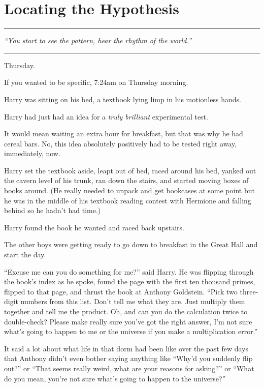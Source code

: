 \chapter{Locating the Hypothesis}

\begin{center}\rule{3in}{0.4pt}\end{center}

\emph{``You start to see the pattern, hear the rhythm of the world.''}

\begin{center}\rule{3in}{0.4pt}\end{center}

Thursday.

If you wanted to be specific, 7:24am on Thursday morning.

Harry was sitting on his bed, a textbook lying limp in his motionless
hands.

Harry had just had an idea for a \emph{truly brilliant} experimental
test.

It would mean waiting an extra hour for breakfast, but that was why he
had cereal bars. No, this idea absolutely positively had to be tested
right away, immediately, now.

Harry set the textbook aside, leapt out of bed, raced around his bed,
yanked out the cavern level of his trunk, ran down the stairs, and
started moving boxes of books around. (He really needed to unpack and
get bookcases at some point but he was in the middle of his textbook
reading contest with Hermione and falling behind so he hadn't had time.)

Harry found the book he wanted and raced back upstairs.

The other boys were getting ready to go down to breakfast in the Great
Hall and start the day.

``Excuse me can you do something for me?'' said Harry. He was flipping
through the book's index as he spoke, found the page with the first ten
thousand primes, flipped to that page, and thrust the book at Anthony
Goldstein. ``Pick two three-digit numbers from this list. Don't tell me
what they are. Just multiply them together and tell me the product. Oh,
and can you do the calculation twice to double-check? Please make really
sure you've got the right answer, I'm not sure what's going to happen to
me or the universe if you make a multiplication error.''

It said a lot about what life in that dorm had been like over the past
few days that Anthony didn't even bother saying anything like ``Why'd
you suddenly flip out?'' or ``That seems really weird, what are your
reasons for asking?'' or ``What do you mean, you're not sure what's
going to happen to the universe?''

